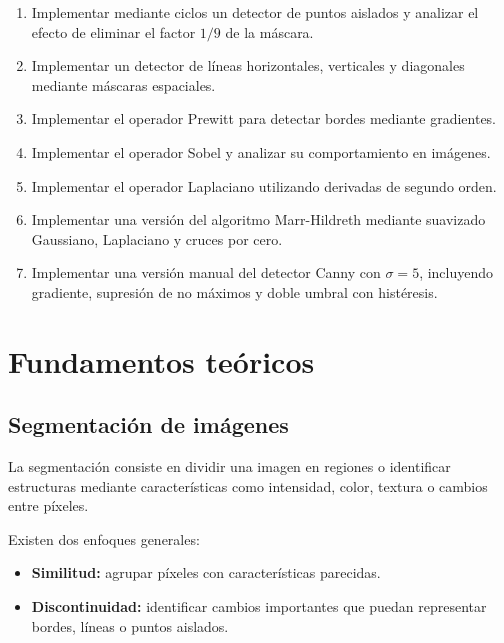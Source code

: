 \documentclass[11pt,letterpaper]{article}
\begin{document}
\begin{enumerate}

    \item Implementar mediante ciclos un detector
    de puntos aislados y analizar el efecto de
    eliminar el factor $1/9$ de la máscara.

    \item Implementar un detector de líneas
    horizontales, verticales y diagonales
    mediante máscaras espaciales.

    \item Implementar el operador Prewitt
    para detectar bordes mediante gradientes.

    \item Implementar el operador Sobel
    y analizar su comportamiento en imágenes.

    \item Implementar el operador Laplaciano
    utilizando derivadas de segundo orden.

    \item Implementar una versión del algoritmo
    Marr-Hildreth mediante suavizado Gaussiano,
    Laplaciano y cruces por cero.

    \item Implementar una versión manual del
    detector Canny con $\sigma=5$, incluyendo
    gradiente, supresión de no máximos
    y doble umbral con histéresis.

\end{enumerate}

\section{Fundamentos teóricos}

\subsection{Segmentación de imágenes}

La segmentación consiste en dividir una imagen
en regiones o identificar estructuras mediante
características como intensidad, color,
textura o cambios entre píxeles.

Existen dos enfoques generales:

\begin{itemize}

    \item \textbf{Similitud:} agrupar píxeles
    con características parecidas.

    \item \textbf{Discontinuidad:} identificar
    cambios importantes que puedan representar
    bordes, líneas o puntos aislados.

\end{itemize}
\end{document}
